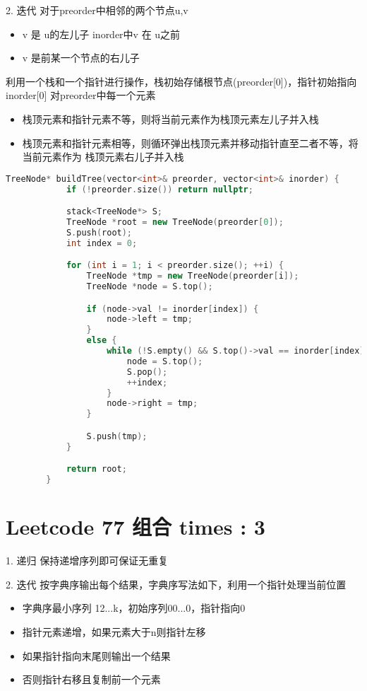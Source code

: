 \documentclass[UTF8]{ctexart}
\begin{document}
2. 迭代
对于preorder中相邻的两个节点u,v
\begin{itemize}
	\item v 是 u的左儿子 inorder中v 在 u之前
	\item v 是前某一个节点的右儿子 
\end{itemize}
利用一个栈和一个指针进行操作，栈初始存储根节点(preorder[0])，指针初始指向inorder[0]
对preorder中每一个元素
\begin{itemize}
	\item 栈顶元素和指针元素不等，则将当前元素作为栈顶元素左儿子并入栈
	\item 栈顶元素和指针元素相等，则循环弹出栈顶元素并移动指针直至二者不等，将当前元素作为
			栈顶元素右儿子并入栈
\end{itemize}
\begin{framed}
	\begin{lstlisting}[language=C++]
		TreeNode* buildTree(vector<int>& preorder, vector<int>& inorder) {
			if (!preorder.size()) return nullptr;

			stack<TreeNode*> S;
			TreeNode *root = new TreeNode(preorder[0]);
			S.push(root);
			int index = 0;

			for (int i = 1; i < preorder.size(); ++i) {
				TreeNode *tmp = new TreeNode(preorder[i]);
				TreeNode *node = S.top();

				if (node->val != inorder[index]) {
					node->left = tmp;
				}
				else {
					while (!S.empty() && S.top()->val == inorder[index]) {
						node = S.top();
						S.pop();
						++index;
					}
					node->right = tmp;
				}

				S.push(tmp);
			}

			return root;
		}
	\end{lstlisting}
\end{framed}


\section{Leetcode 77 组合 times : 3}
1. 递归 保持递增序列即可保证无重复

2. 迭代 按字典序输出每个结果，字典序写法如下，利用一个指针处理当前位置
\begin{itemize}
	\item 字典序最小序列 12...k，初始序列00...0，指针指向0
	\item 指针元素递增，如果元素大于n则指针左移
	\item 如果指针指向末尾则输出一个结果
	\item 否则指针右移且复制前一个元素
\end{itemize}
\end{document}

